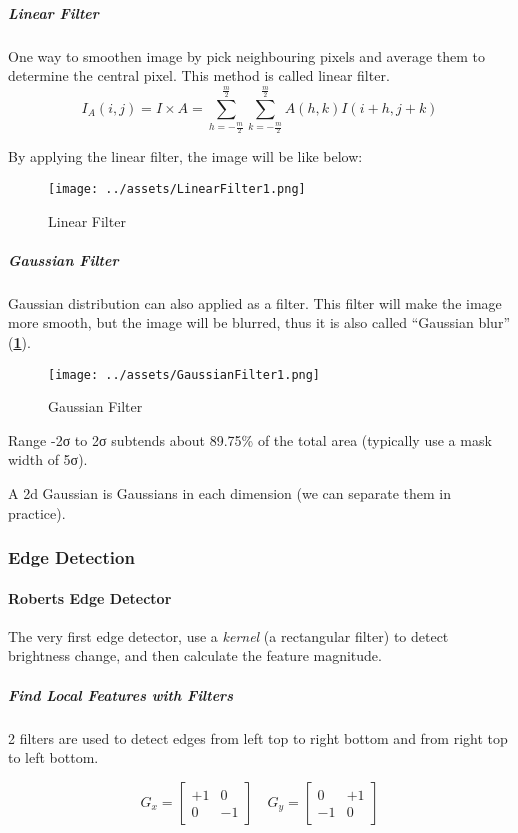 \documentclass[a4paper, openany]{book}
\begin{document}
\subparagraph{Linear Filter}

One way to smoothen image by pick neighbouring pixels and average them to determine the central pixel. This method is called linear filter.
$$I_A(i, j) = I \times A = \sum_{h=-\frac{m}{2}}^{\frac{m}{2}} \sum_{k=-\frac{m}{2}}^{\frac{m}{2}} A(h, k) I(i + h, j + k)$$

By applying the linear filter, the image will be like below:

\begin{figure}[htbp]
  \centering
  \texttt{[image: ../assets/LinearFilter1.png]}
  \caption{Linear Filter}
\end{figure}

\subparagraph{Gaussian Filter}

Gaussian distribution can also applied as a filter. This filter will make the image more smooth, but the image will be blurred, thus it is also called ``Gaussian blur'' (\textbf{\cref{fig:GaussianFilter1}}).

\begin{figure}[htbp]
  \centering
  \texttt{[image: ../assets/GaussianFilter1.png]}
  \caption{Gaussian Filter}
  \label{fig:GaussianFilter1}
\end{figure}

Range -2σ to 2σ subtends about 89.75\% of the total area (typically use a mask width of 5σ).

A 2d Gaussian is Gaussians in each dimension (we can separate them in practice).

\subsubsection{Edge Detection}

\paragraph{Roberts Edge Detector}

The very first edge detector, use a \textit{kernel} (a rectangular filter) to detect brightness change, and then calculate the feature magnitude.

\subparagraph{Find Local Features with Filters}

2 filters are used to detect edges from left top to right bottom and from right top to left bottom.

$$G_x = \begin{bmatrix} +1 & 0 \\ 0 & -1 \end{bmatrix} \quad G_y = \begin{bmatrix} 0 & +1 \\ -1 & 0 \end{bmatrix}$$
\end{document}
